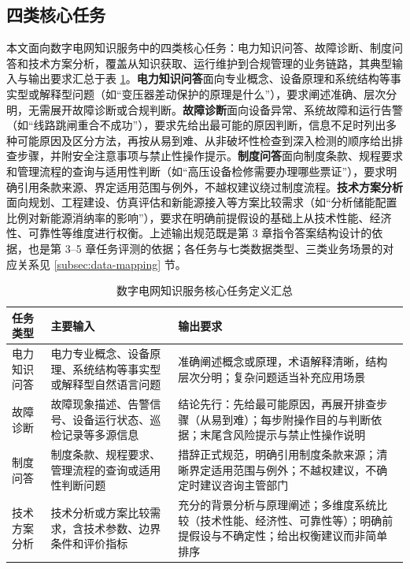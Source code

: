 \documentclass[fontset=fandol,type=master,campus=shenzhen,etitleauto=true]{hithesisbook}
\begin{document}
\subsection{四类核心任务}\label{ux4efbux52a1ux5b9aux4e49}

本文面向数字电网知识服务中的四类核心任务：电力知识问答、故障诊断、制度问答和技术方案分析，覆盖从知识获取、运行维护到合规管理的业务链路，其典型输入与输出要求汇总于表 \ref{tab:task-def}。\textbf{电力知识问答}面向专业概念、设备原理和系统结构等事实型或解释型问题（如``变压器差动保护的原理是什么''），要求阐述准确、层次分明，无需展开故障诊断或合规判断。\textbf{故障诊断}面向设备异常、系统故障和运行告警（如``线路跳闸重合不成功''），要求先给出最可能的原因判断，信息不足时列出多种可能原因及区分方法，再按从易到难、从非破坏性检查到深入检测的顺序给出排查步骤，并附安全注意事项与禁止性操作提示。\textbf{制度问答}面向制度条款、规程要求和管理流程的查询与适用性判断（如``高压设备检修需要办理哪些票证''），要求明确引用条款来源、界定适用范围与例外，不越权建议绕过制度流程。\textbf{技术方案分析}面向规划、工程建设、仿真评估和新能源接入等方案比较需求（如``分析储能配置比例对新能源消纳率的影响''），要求在明确前提假设的基础上从技术性能、经济性、可靠性等维度进行权衡。上述输出规范既是第 3 章指令答案结构设计的依据，也是第 3--5 章任务评测的依据；各任务与七类数据类型、三类业务场景的对应关系见 \ref{subsec:data-mapping} 节。

\begin{table}[htbp]
\centering
\caption{数字电网知识服务核心任务定义汇总}
\label{tab:task-def}
\small
\begin{tabular}{p{2.5cm}p{4.5cm}p{6.0cm}}
\toprule
\textbf{任务类型} & \textbf{主要输入} & \textbf{输出要求} \\
\midrule
电力知识问答 & 电力专业概念、设备原理、系统结构等事实型或解释型自然语言问题 & 准确阐述概念或原理，术语解释清晰，结构层次分明；复杂问题适当补充应用场景 \\
\addlinespace
故障诊断 & 故障现象描述、告警信号、设备运行状态、巡检记录等多源信息 & 结论先行：先给最可能原因，再展开排查步骤（从易到难）；每步附操作目的与判断依据；末尾含风险提示与禁止性操作说明 \\
\addlinespace
制度问答 & 制度条款、规程要求、管理流程的查询或适用性判断问题 & 措辞正式规范，明确引用制度条款来源；清晰界定适用范围与例外；不越权建议，不确定时建议咨询主管部门 \\
\addlinespace
技术方案分析 & 技术分析或方案比较需求，含技术参数、边界条件和评价指标 & 充分的背景分析与原理阐述；多维度系统比较（技术性能、经济性、可靠性等）；明确前提假设与不确定性；给出权衡建议而非简单排序 \\
\bottomrule
\end{tabular}
\end{table}
\end{document}
